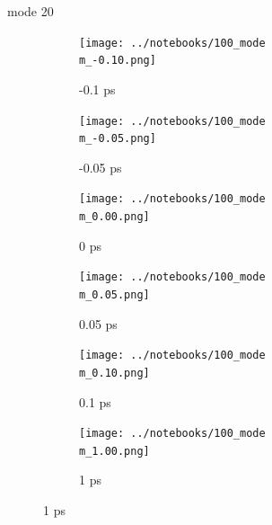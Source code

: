 \documentclass{beamer}
\begin{document}
\renewcommand\m{20}
\begin{frame}{mode \m}
	\begin{figure}
		\centering
		\begin{subfigure}[b]{\w\textwidth}
			\centering
			\texttt{[image: ../notebooks/100\_mode\\m\_-0.10.png]}
			\caption{-0.1 ps}
		\end{subfigure}
		\begin{subfigure}[b]{\w\textwidth}
			\centering
			\texttt{[image: ../notebooks/100\_mode\\m\_-0.05.png]}
			\caption{-0.05 ps}
		\end{subfigure}
		\begin{subfigure}[b]{\w\textwidth}
			\centering
			\texttt{[image: ../notebooks/100\_mode\\m\_0.00.png]}
			\caption{0 ps}
		\end{subfigure}
		\begin{subfigure}[b]{\w\textwidth}
			\centering
			\texttt{[image: ../notebooks/100\_mode\\m\_0.05.png]}
			\caption{0.05 ps}
		\end{subfigure}
		\begin{subfigure}[b]{\w\textwidth}
			\centering
			\texttt{[image: ../notebooks/100\_mode\\m\_0.10.png]}
			\caption{0.1 ps}
		\end{subfigure}
		\begin{subfigure}[b]{\w\textwidth}
			\centering
			\texttt{[image: ../notebooks/100\_mode\\m\_1.00.png]}
			\caption{1 ps}
		\end{subfigure}
	\end{figure}
\end{frame}
\end{document}
